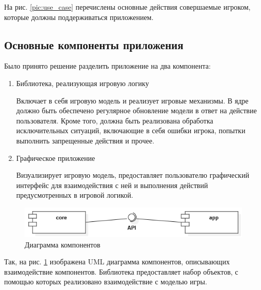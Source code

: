 На рис. \ref{pic:use_case} перечислены основные действия совершаемые игроком, которые должны поддерживаться приложением.

\subsection{Основные компоненты приложения}

Было принято решение разделить приложение на два компонента:

\begin{enumerate}
	\item Библиотека, реализующая игровую логику
		
	 Включает в себя игровую модель и реализует игровые механизмы. В ядре должно быть обеспечено регулярное обновление модели в ответ на действие пользователя. Кроме того, должна быть реализована обработка исключительных ситуаций, включающие в себя ошибки игрока, попытки выполнить запрещенные действия и прочее. 	 
	
	\item Графическое приложение 

	Визуализирует игровую модель, предоставляет пользователю графический интерфейс для взаимодействия с ней и выполнения действий предусмотренных в игровой логикой.
\end{enumerate}

\begin{figure}[H]
	\begin{center}
		\includegraphics[scale=0.7]{../../uml/ComponentDiagram1.png}
		\caption{Диаграмма компонентов}
		\label{pic:components}
	\end{center}
\end{figure}

Так, на рис. \ref{pic:components} изображена UML диаграмма компонентов, описывающих взаимодействие компонентов. Библиотека предоставляет набор объектов, с помощью которых реализовано взаимодействие с моделью игры.  


%
%
%

